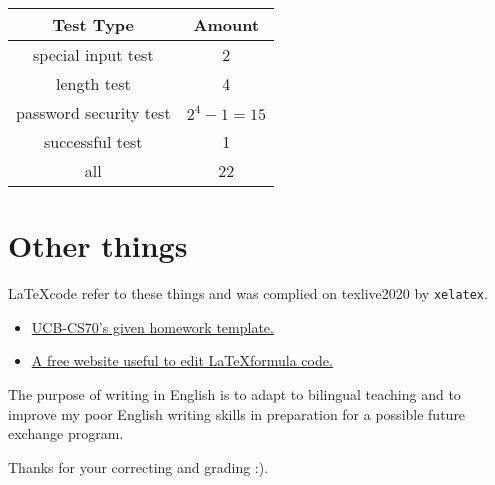 \documentclass[11pt, oneside]{article}  %
\begin{document}
    \begin{table}[H]
        \centering
        \begin{tabular}{|c|c|}
        \hline
        \textbf{Test Type}     & \textbf{Amount}           \\ \hline
        special input test     & 2                         \\ \hline
        length test            & 4                         \\ \hline
        password security test & $2^4-1=15$                \\ \hline
        successful test        & 1                         \\ \hline
        all                    & 22                        \\ \hline
        \end{tabular}
    \end{table}


\section*{Other things}

    \LaTeX \space code refer to these things and was complied on texlive2020 by \lstinline{xelatex}.
    \begin{itemize}
        \item  \href{https://www.eecs70.org/assets/misc/homework_template.tex}{UCB-CS70's given homework template.} 
        \item  \href{https://www.latexlive.com}{A free website useful to edit \LaTeX \space formula code.}
    \end{itemize}

    The purpose of writing in English is to adapt to bilingual teaching and to improve my poor English 
    writing skills in preparation for a possible future exchange program. 

    Thanks for your correcting and grading :).
\end{document}
